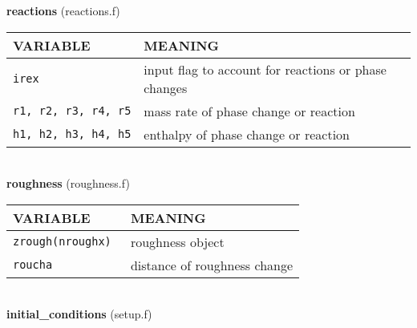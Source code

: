 %
%
{\large{\bf reactions}} (reactions.f)\\[5mm]
\begin{tabular}{|p{6cm}|p{6cm}|}\hline
VARIABLE & MEANING\\\hline
\tt irex & input flag to account for reactions or phase changes\\\hline 
\tt r1, r2, r3, r4, r5 & mass rate of phase change or reaction\\\hline
\tt h1, h2, h3, h4, h5 & enthalpy of phase change or reaction\\\hline
\end{tabular}\\[5mm]
%
%
{\large{\bf roughness}} (roughness.f)\\[5mm]
\begin{tabular}{|p{6cm}|p{6cm}|}\hline
VARIABLE & MEANING\\\hline
\tt zrough(nroughx) & roughness object\\\hline
\tt roucha & distance of roughness change\\\hline
\end{tabular}\\[5mm]
%
%
{\large{\bf initial\_conditions}} (setup.f)\\[5mm]

